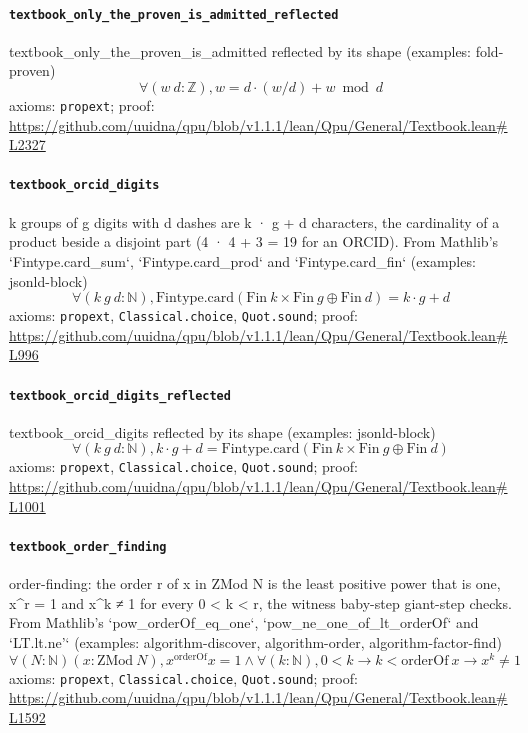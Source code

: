 \documentclass[11pt]{article}
\begin{document}
\paragraph{\texttt{textbook\_only\_the\_proven\_is\_admitted\_reflected}}
textbook\_only\_the\_proven\_is\_admitted reflected by its shape (examples: fold-proven)
\[ \forall (w\ d : \mathbb{Z}), w = d \cdot (w / d) + w \bmod d \]
\noindent axioms: \texttt{propext}; proof: \url{https://github.com/uuidna/qpu/blob/v1.1.1/lean/Qpu/General/Textbook.lean\#L2327}

\paragraph{\texttt{textbook\_orcid\_digits}}
k groups of g digits with d dashes are k · g + d characters, the cardinality of a product beside a disjoint part (4 · 4 + 3 = 19 for an ORCID). From Mathlib's `Fintype.card\_sum`, `Fintype.card\_prod` and `Fintype.card\_fin` (examples: jsonld-block)
\[ \forall (k\ g\ d : \mathbb{N}), \mathrm{Fintype.card} (\mathrm{Fin}\ k \times \mathrm{Fin}\ g \oplus \mathrm{Fin}\ d) = k \cdot g + d \]
\noindent axioms: \texttt{propext}, \texttt{Classical.choice}, \texttt{Quot.sound}; proof: \url{https://github.com/uuidna/qpu/blob/v1.1.1/lean/Qpu/General/Textbook.lean\#L996}

\paragraph{\texttt{textbook\_orcid\_digits\_reflected}}
textbook\_orcid\_digits reflected by its shape (examples: jsonld-block)
\[ \forall (k\ g\ d : \mathbb{N}), k \cdot g + d = \mathrm{Fintype.card} (\mathrm{Fin}\ k \times \mathrm{Fin}\ g \oplus \mathrm{Fin}\ d) \]
\noindent axioms: \texttt{propext}, \texttt{Classical.choice}, \texttt{Quot.sound}; proof: \url{https://github.com/uuidna/qpu/blob/v1.1.1/lean/Qpu/General/Textbook.lean\#L1001}

\paragraph{\texttt{textbook\_order\_finding}}
order-finding: the order r of x in ZMod N is the least positive power that is one, x\^{}r = 1 and x\^{}k ≠ 1 for every 0 < k < r, the witness baby-step giant-step checks. From Mathlib's `pow\_orderOf\_eq\_one`, `pow\_ne\_one\_of\_lt\_orderOf` and `LT.lt.ne'` (examples: algorithm-discover, algorithm-order, algorithm-factor-find)
\[ \forall (N : \mathbb{N}) (x : \mathrm{ZMod}\ N), x ^{\mathrm{orderOf}} x = 1 \land \forall (k : \mathbb{N}), 0 < k \to k < \mathrm{orderOf}\ x \to x ^{k} \ne 1 \]
\noindent axioms: \texttt{propext}, \texttt{Classical.choice}, \texttt{Quot.sound}; proof: \url{https://github.com/uuidna/qpu/blob/v1.1.1/lean/Qpu/General/Textbook.lean\#L1592}
\end{document}
